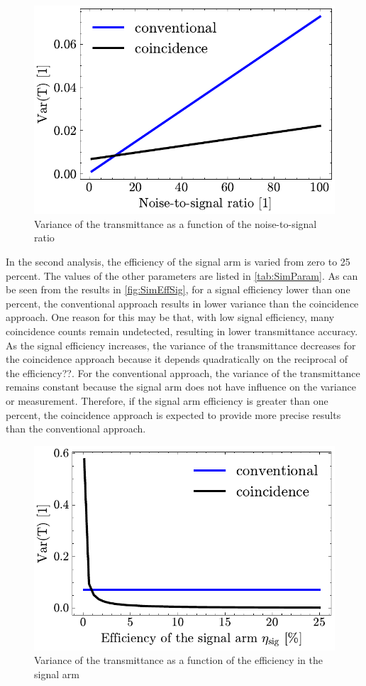 \begin{figure}[t!]
	\centering
	\includegraphics[width=.7\textwidth]{Images/SimulationSweepSNR_2.pdf}
	\caption{Variance of the transmittance as a function of the noise-to-signal ratio}
	\label{fig:SimSNR}
\end{figure}\newline
In the second analysis, the efficiency of the signal arm is varied from zero to 25 percent. The values of the other parameters are listed in \autoref{tab:SimParam}. As can be seen from the results in \autoref{fig:SimEffSig}, for a signal efficiency lower than one percent, the conventional approach results in lower variance than the coincidence approach. One reason for this may be that, with low signal efficiency, many coincidence counts remain undetected, resulting in lower transmittance accuracy. As the signal efficiency increases, the variance of the transmittance decreases for the coincidence approach because it depends quadratically on the reciprocal of the efficiency??. For the conventional approach, the variance of the transmittance remains constant because the signal arm does not have influence on the variance or measurement. Therefore, if the signal arm efficiency is greater than one percent, the coincidence approach is expected to provide more precise results than the conventional approach.
\begin{figure}[t!]
	\centering
	\includegraphics[width=.65\textwidth]{Images/SimulationSweepEffSig_2.pdf}
	\caption{Variance of the transmittance as a function of the efficiency in the signal arm}
	\label{fig:SimEffSig}
\end{figure}\newline
